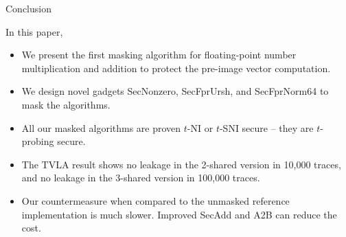 \begin{frame}{Conclusion}

In this paper,
\pause
\begin{itemize}
	\item We present the first masking algorithm for floating-point number multiplication and addition to protect the pre-image vector computation.
	\pause
	\item We design novel gadgets {\sf SecNonzero}, {\sf SecFprUrsh}, and {\sf SecFprNorm64} to mask the algorithms.
	\pause
	\item All our masked algorithms are proven $t$-NI or $t$-SNI secure – they are $t$-probing secure.
	\pause
	\item The TVLA result shows no leakage in the 2-shared version in 10,000 traces, and no leakage in the 3-shared version in 100,000 traces.
	\pause
	\item Our countermeasure when compared to the unmasked reference implementation is much slower. Improved {\sf SecAdd} and {\sf A2B} can reduce the cost.
\end{itemize}


\end{frame}